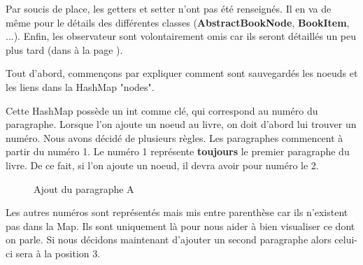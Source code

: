 			Par soucis de place, les getters et setter n'ont pas été renseignés. Il en va de même pour le détails des différentes classes (\textbf{AbstractBookNode}, \textbf{BookItem}, ...). Enfin, les observateur sont volontairement omis car ils seront détaillés un peu plus tard (dans  à la page \pageref{subsec:pattern_observer}).

			Tout d'abord, commençons par expliquer comment sont sauvegardés les noeuds et les liens dans la HashMap "nodes".

			Cette HashMap possède un int comme clé, qui correspond au numéro du paragraphe. Lorsque l'on ajoute un noeud au livre, on doit d'abord lui trouver un numéro. Nous avons décidé de plusieurs règles. Les paragraphes commencent à partir du numéro 1. Le numéro 1 représente \textbf{toujours} le premier paragraphe du livre. De ce fait, si l'on ajoute un noeud, il devra avoir pour numéro le 2.

			\begin{figure}[H]
				\begin{center}
				\end{center}
				\caption{Ajout du paragraphe A}
			\end{figure}

			Les autres numéros sont représentés mais mis entre parenthèse car ils n'existent pas dans la Map. Ils sont uniquement là pour nous aider à bien visualiser ce dont on parle. Si nous décidons maintenant d'ajouter un second paragraphe alors celui-ci sera à la position 3.

